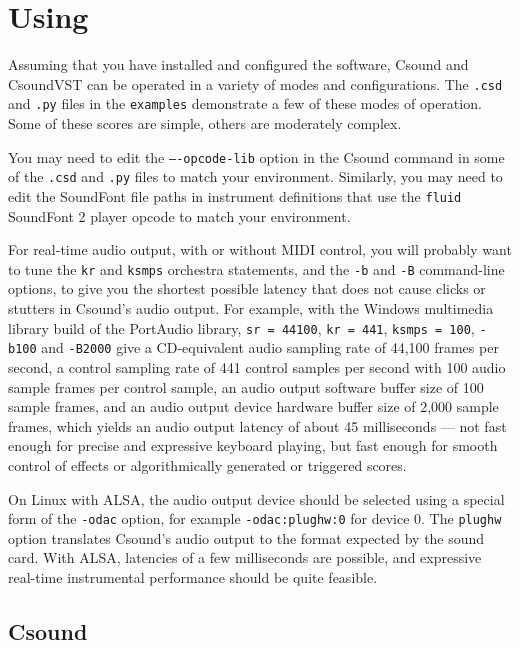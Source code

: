 \documentclass[10pt,letterpaper,onecolumn]{ltxguide}
\begin{document}
\section{Using}

Assuming that you have installed and configured the software, Csound and CsoundVST can be operated in a variety of modes and configurations. The \texttt{.csd} and \texttt{.py} files in the \texttt{examples} demonstrate a few of these modes of operation. Some of these scores are simple, others are moderately complex. 

You may need to edit the \texttt{----opcode-lib} option in the Csound command in some of the  \texttt{.csd} and \texttt{.py} files to match your environment. Similarly, you may need to edit the SoundFont file paths in instrument definitions that use the \texttt{fluid} SoundFont 2 player opcode to match your environment.

For real-time audio output, with or without MIDI control, you will probably want to tune the \texttt{kr} and \texttt{ksmps} orchestra statements, and the \texttt{-b} and \texttt{-B} command-line options, to give you the shortest possible latency that does not cause clicks or stutters in Csound's audio output. For example, with the Windows multimedia library build of the PortAudio library, \texttt{sr = 44100}, \texttt{kr = 441}, \texttt{ksmps = 100}, \texttt{-b100} and \texttt{-B2000} give a CD-equivalent audio sampling rate of 44,100 frames per second, a control sampling rate of 441 control samples per second with 100 audio sample frames per control sample, an audio output software buffer size of 100 sample frames, and an audio output device hardware buffer size of 2,000 sample frames, which yields an audio output latency of about 45 milliseconds --- not fast enough for precise and expressive keyboard playing, but fast enough for smooth control of effects or algorithmically generated or triggered scores.

On Linux with ALSA, the audio output device should be selected using a special form of the \texttt{-odac} option, for example \texttt{-odac:plughw:0} for device 0. The \texttt{plughw} option translates Csound's audio output to the format expected by the sound card. With ALSA, latencies of a few milliseconds are possible, and expressive real-time instrumental performance should be quite feasible.

\subsection{Csound}
\end{document}
